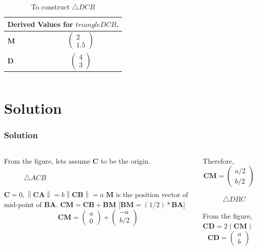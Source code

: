 \documentclass{beamer}
\newcommand\norm[1]{\left\lVert#1\right\rVert}
\renewcommand{\vec}[1]{\mathbf{#1}}
\begin{document}
\begin{frame}[fragile]
\begin{columns}
\begin{column}{0.5\textwidth}
\begin{table}[H]
{\begin{minipage}{\textwidth}
\begin{tabular}{ |p{3cm}|p{3cm}|  }
\hline
 \multicolumn{2}{|c|}{Derived Values for $triangle DCB$.} \\
\hline
$\vec{M}$ & $$\begin{pmatrix}2\\1.5\end{pmatrix}$$\\				
\hline
$\vec{D}$ & $$\begin{pmatrix}4\\3\end{pmatrix} $$\\
\hline
\end{tabular}
\end{minipage}}
\caption{\tiny To construct $\triangle DCB$}
\end{table}
\end{column}
\end{columns}
\end{frame}
\section*{\textbf{Solution}}
\begin{frame}[fragile]
\footnotesize
\frametitle{Solution}
\begin{columns}
\begin{column}{0.5\textwidth}
From the figure, lets assume $\vec{C}$ to be the origin.
\newline
\begin{figure}[H]

\caption{$\triangle ACB$}
\end{figure}
$\vec{C}=0, 
\norm{\vec{CA}}=b 
\norm{\vec{CB}}=a$
\newline
$\vec{M}$ is the position vector of mid-point of $\vec{BA}$.
\newline
$\vec{CM} = \vec{CB}+\vec{BM}$ [$\vec{BM}=(1/2)*\vec{BA}$]
\newline
$$\vec{CM} =\begin{pmatrix}a\\0\end{pmatrix}+\begin{pmatrix}-a\\b/2\end{pmatrix}$$
\end{column}
\begin{column}{0.5\textwidth}
Therefore, $$\vec{CM}=\begin{pmatrix}a/2\\b/2\end{pmatrix}$$
\begin{figure}[H]

\caption{$\triangle DBC$}
\end{figure}
From the figure, $\vec{CD}=2(\vec{CM})$
\newline
$$\vec{CD}=\begin{pmatrix}a\\b\end{pmatrix}$$
\end{column}
\end{columns}
\end{frame}
\end{document}
